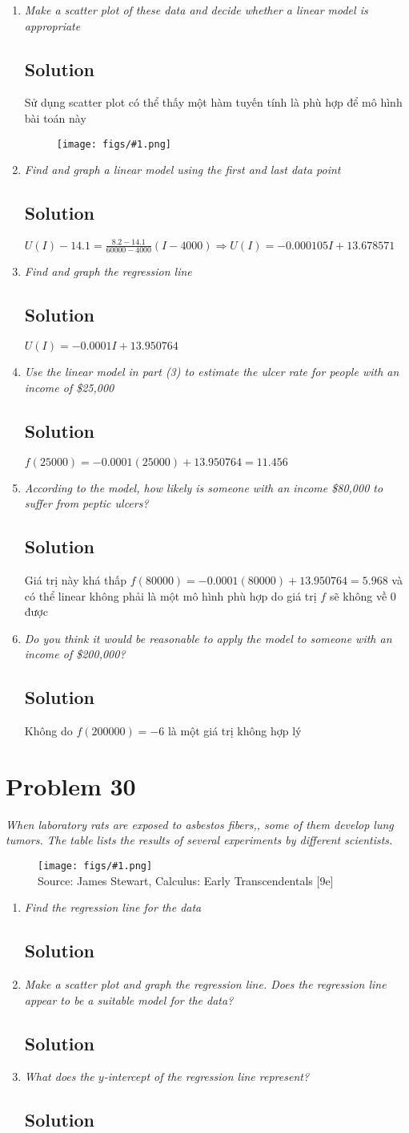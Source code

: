 \documentclass[11pt]{article}
\newcommand{\soln}{\subsection*}
\newcommand{\qn}{\textit}
\newcommand{\imagesource}[1]{{\footnotesize Source: #1}}
\newcommand{\imgqn}[1]{
	\begin{figure}[H]
		\centering
		\texttt{[image: figs/\#1.png]}\\
		\imagesource{James Stewart, Calculus: Early Transcendentals [9e]}
	\end{figure}
}
\newcommand{\imgsoln}[1]{
	\begin{figure}[H]
		\centering
		\texttt{[image: figs/\#1.png]}
	\end{figure}
}
\begin{document}
\begin{enumerate}
	\item \qn{Make a scatter plot of these data and decide whether a linear model is appropriate}
	\soln{Solution}
	Sử dụng scatter plot có thể thấy một hàm tuyến tính là phù hợp để mô hình bài toán này
	\imgsoln{1.2.29-ans.a}
	
	\item \qn{Find and graph a linear model using the first and last data point}
	\soln{Solution}
	$U(I)-14.1=\frac{8.2-14.1}{60000-4000}(I-4000) \Rightarrow U(I)=-0.000105I + 13.678571$
	
	\item \qn{Find and graph the regression line}
	\soln{Solution}
	$U(I)=-0.0001I+13.950764$
	
	\item \qn{Use the linear model in part (3) to estimate the ulcer rate for people with an income of \$25,000}
	\soln{Solution}
	$f(25000)=-0.0001(25000)+13.950764=11.456$
	
	\item \qn{According to the model, how likely is someone with an income \$80,000 to suffer from peptic ulcers?}
	\soln{Solution}
	Giá trị này khá thấp $f(80000)=-0.0001(80000)+13.950764=5.968$ và có thể linear không phải là một mô hình phù hợp do giá trị $f$ sẽ không về 0 được
	
	\item \qn{Do you think it would be reasonable to apply the model to someone with an income of \$200,000?}
	\soln{Solution}
	Không do $f(200000)=-6$ là một giá trị không hợp lý
\end{enumerate}

\section*{Problem 30}

\qn{When laboratory rats are exposed to asbestos fibers,, some of them develop lung tumors. The table lists the results of several experiments by different scientists.}

\imgqn{1.2.30}

\begin{enumerate}
	\item \qn{Find the regression line for the data}
	\soln{Solution}
	
	\item \qn{Make a scatter plot and graph the regression line. Does the regression line appear to be a suitable model for the data?}
	\soln{Solution}
	
	\item \qn{What does the $y$-intercept of the regression line represent?}
	\soln{Solution}
\end{enumerate}
\end{document}
